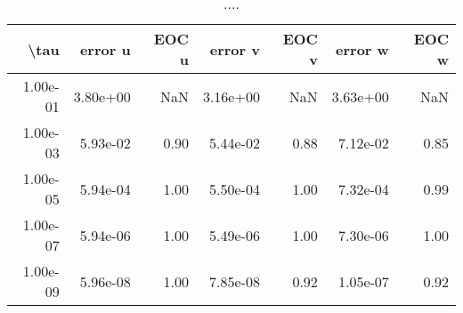\begin{table}[ht]
\centering
\begin{tabular}{rrrrrrr}
  \hline
  \textbf{\textbackslash{}tau} & \textbf{error u} & \textbf{EOC u} & \textbf{error v} & \textbf{EOC v} & \textbf{error w} & \textbf{EOC w} \\\hline
  1.00e-01 & 3.80e+00 & NaN & 3.16e+00 & NaN & 3.63e+00 & NaN \\
  1.00e-03 & 5.93e-02 & 0.90 & 5.44e-02 & 0.88 & 7.12e-02 & 0.85 \\
  1.00e-05 & 5.94e-04 & 1.00 & 5.50e-04 & 1.00 & 7.32e-04 & 0.99 \\
  1.00e-07 & 5.94e-06 & 1.00 & 5.49e-06 & 1.00 & 7.30e-06 & 1.00 \\
  1.00e-09 & 5.96e-08 & 1.00 & 7.85e-08 & 0.92 & 1.05e-07 & 0.92 \\\hline
\end{tabular}
\caption{....}
\end{table}
